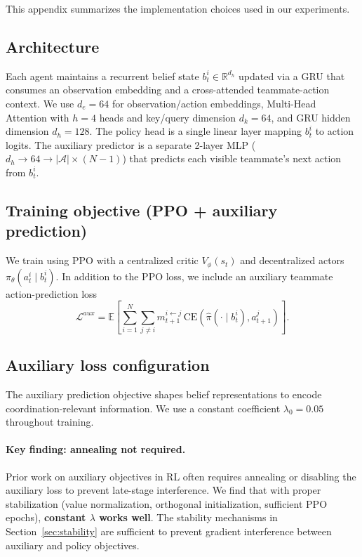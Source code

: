 \documentclass{article}
\theoremstyle{plain}
\theoremstyle{definition}
\theoremstyle{remark}
\begin{document}
This appendix summarizes the implementation choices used in our experiments.

\subsection{Architecture}
Each agent maintains a recurrent belief state $b_t^i \in \mathbb{R}^{d_h}$ updated via a GRU that consumes an observation embedding and a cross-attended teammate-action context. We use $d_e{=}64$ for observation/action embeddings, Multi-Head Attention with $h{=}4$ heads and key/query dimension $d_k{=}64$, and GRU hidden dimension $d_h{=}128$. The policy head is a single linear layer mapping $b_t^i$ to action logits. The auxiliary predictor is a separate 2-layer MLP ($d_h \to 64 \to |\mathcal{A}| \times (N-1)$) that predicts each visible teammate's next action from $b_t^i$.

\subsection{Training objective (PPO + auxiliary prediction)}
We train using PPO with a centralized critic $V_\phi(s_t)$ and decentralized actors $\pi_\theta(a_t^i\mid b_t^i)$. In addition to the PPO loss, we include an auxiliary teammate action-prediction loss
\begin{equation}
\mathcal{L}^{aux}
=
\mathbb{E}\left[\sum_{i=1}^N\sum_{j\neq i} m_{t+1}^{i\leftarrow j}\,\mathrm{CE}(\hat{\pi}(\cdot\mid b_t^i), a_{t+1}^j)\right].
\end{equation}

\subsection{Auxiliary loss configuration}
The auxiliary prediction objective shapes belief representations to encode coordination-relevant information. We use a constant coefficient $\lambda_0 = 0.05$ throughout training.

\paragraph{Key finding: annealing not required.}
Prior work on auxiliary objectives in RL often requires annealing or disabling the auxiliary loss to prevent late-stage interference. We find that with proper stabilization (value normalization, orthogonal initialization, sufficient PPO epochs), \textbf{constant $\lambda$ works well}. The stability mechanisms in Section~\ref{sec:stability} are sufficient to prevent gradient interference between auxiliary and policy objectives.
\end{document}

